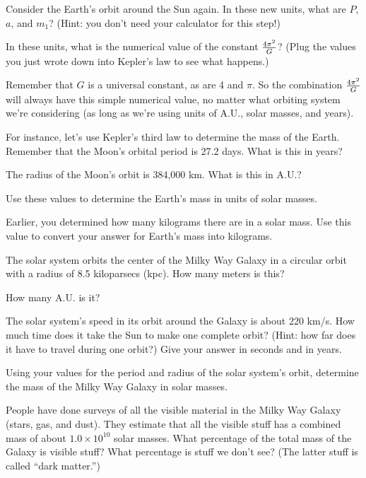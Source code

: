 Consider the Earth's orbit around the Sun again.  In these new units,
what are $P$, $a$, and $m_1$?  (Hint: you don't need your calculator for
this step!)

\answerspace{1in}

In these units, what is the numerical value of the constant ${4\pi^2\over G}$?
(Plug the values you just wrote down into Kepler's law to see what happens.)

\answerspace{1in}

Remember that $G$ is a universal constant, as are 4 and $\pi$. 
So the combination ${4\pi^2\over G}$ will always have this simple
numerical value, no matter what orbiting system we're considering (as
long as we're using units of A.U., solar masses, and years).

For instance, let's use Kepler's third law to determine the mass
of the Earth.  Remember that the Moon's orbital period is 27.2 days.
What is this in years?

\answerspace{1in}

The radius of the Moon's orbit is 384,000 km.  What is this in A.U.?

\answerspace{1in}

Use these values to determine the Earth's mass in units of solar masses.

\answerspace{2in}

Earlier, you determined how many kilograms there are in a solar mass.
Use this value to convert your answer for Earth's mass into kilograms.

\answerspace{1in}

The solar system orbits the center of the Milky Way Galaxy in a circular
orbit with a radius of 8.5 kiloparsecs (kpc).  How many meters is this?

\answerspace{1in}

How many A.U. is it?

\answerspace{1in}

The solar system's speed in its orbit around the Galaxy is about 220 km/s.
How much time does it take the Sun to make one complete orbit?  (Hint:
how far does it have to travel during one orbit?)  Give your answer in
seconds and in years.

\answerspace{2in}

Using your values for the period and radius of the solar system's
orbit, determine the mass of the Milky Way Galaxy in solar masses.

\answerspace{2in}

People have done surveys of all the visible material in the Milky
Way Galaxy (stars, gas, and dust).  They estimate that all the
visible stuff has a combined mass of about $1.0\times 10^{10}$ solar
masses.  What percentage of the total mass of the Galaxy is visible
stuff?  What percentage is stuff we don't see?  (The latter
stuff is called ``dark matter.'')


